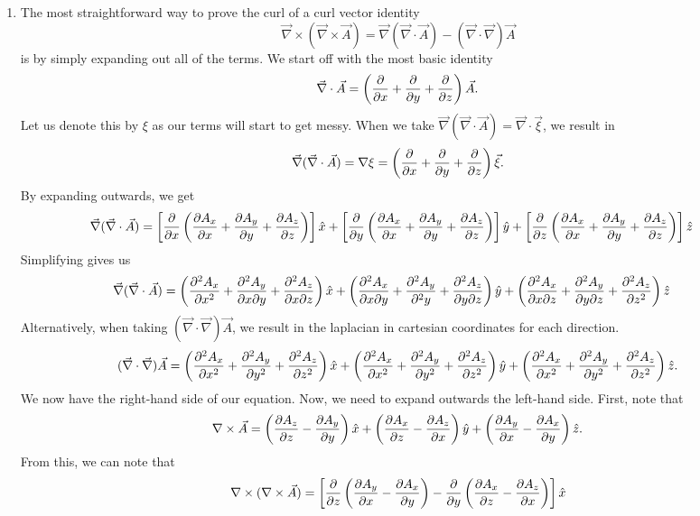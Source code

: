 \begin{sol}
\begin{enumerate}[label=\textbf{(\alph*)}]
\item The most straightforward way to prove the curl of a curl vector identity 
\[\vec{\nabla}\times (\vec{\nabla} \times \vec{A}) = \vec{\nabla}(\vec{\nabla} \cdot \vec{A}) - (\vec{\nabla}\cdot \vec{\nabla}) \vec{A}\]
is by simply expanding out all of the terms. We start off with the most basic identity 
\[\vec{\nabla}\cdot \vec{A} = \left(\pdv{}{x} + \pdv{}{y} + \pdv{z}\right) \vec{A}.\]
Let us denote this by $\xi$ as our terms will start to get messy. When we take $\vec{\nabla}(\vec{\nabla} \cdot \vec{A}) = \vec{\nabla}\cdot \vec{\xi}$, we result in 
\[\vec{\nabla}(\vec{\nabla} \cdot \vec{A}) = \nabla \xi = \left(\pdv{}{x} + \pdv{}{y} + \pdv{z}\right) \vec{\xi}.\]
By expanding outwards, we get 
\begin{align*}
    \vec{\nabla}(\vec{\nabla} \cdot \vec{A}) &= \left[\pdv{}{x} \left(\pdv{A_x}{x} + \pdv{A_y}{y} + \pdv{A_z}{z}\right)\right] \hat{x} + \left[\pdv{}{y} \left(\pdv{A_x}{x} + \pdv{A_y}{y} + \pdv{A_z}{z}\right)\right] \hat{y} + \left[\pdv{}{z} \left(\pdv{A_x}{x} + \pdv{A_y}{y} + \pdv{A_z}{z}\right)\right] \hat{z}
\end{align*}
Simplifying gives us 
\begin{align*}
    \vec{\nabla}(\vec{\nabla} \cdot \vec{A}) &= \left(\pdv{^2 A_x}{x^2} + \pdv{^2 A_y}{x \partial y} + \pdv{^2 A_z}{x \partial z}\right) \hat{x} + \left(\pdv{^2 A_x}{x \partial y} + \pdv{^2 A_y}{^2 y} + \pdv{^2 A_z}{y \partial z}\right) \hat{y} + \left(\pdv{^2 A_x}{x \partial z} + \pdv{^2 A_y}{y \partial z} + \pdv{^2 A_z}{z^2}\right) \hat{z}
\end{align*}
Alternatively, when taking $(\vec{\nabla}\cdot \vec{\nabla})\vec{A}$, we result in the laplacian in cartesian coordinates for each direction.
\[(\vec{\nabla}\cdot \vec{\nabla})\vec{A} = \left(\pdv{^2 A_x}{x^2} + \pdv{^2 A_y}{y^2} + \pdv{^2 A_z}{z^2}\right)\hat{x} + \left(\pdv{^2 A_x}{x^2} + \pdv{^2 A_y}{y^2} + \pdv{^2 A_z}{z^2}\right) \hat{y} + \left(\pdv{^2 A_x}{x^2} + \pdv{^2 A_y}{y^2} + \pdv{^2 A_z}{z^2}\right) \hat{z}.\]
We now have the right-hand side of our equation. Now, we need to expand outwards the left-hand side. First, note that 
\[\nabla \times \vec{A} = \left(\pdv{A_z}{z} - \pdv{A_y}{y}\right)\hat{x} + \left(\pdv{A_x}{z} - \pdv{A_z}{x}\right)\hat{y} + \left(\pdv{A_y}{x} - \pdv{A_x}{y}\right)\hat{z}.\]
From this, we can note that 
\begin{align*}
    \nabla \times (\nabla \times \vec{A}) &= \left[\pdv{}{z}\left(\pdv{A_y}{x} - \pdv{A_x}{y}\right) - \pdv{}{y}\left(\pdv{A_x}{z} - \pdv{A_z}{x}\right)\right] \hat{x}\\

\end{align*}
\end{enumerate}
\end{sol}
